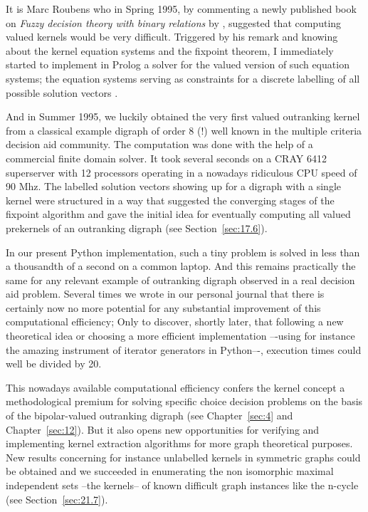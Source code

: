 It is Marc Roubens who in Spring 1995, by commenting a newly published book on \emph{Fuzzy decision theory with binary relations} by \cite{KIT-1993}, suggested that computing valued kernels would be very difficult. Triggered by his remark and knowing about the \Berge kernel equation systems and the \Neumann fixpoint theorem, I immediately started to implement in Prolog a solver for the valued version of such equation systems; the \Berge equation systems serving as constraints for a discrete labelling of all possible solution vectors \citep{BIS-1996}.

And in Summer 1995, we luckily obtained the very first valued outranking kernel from a classical example digraph of order 8 (!) well known in the multiple criteria decision aid community. The computation was done with the help of a commercial finite domain solver. It took several seconds on a CRAY 6412 superserver with 12 processors operating in a nowadays ridiculous CPU speed of 90 Mhz. The labelled solution vectors showing up for a digraph with a single kernel were structured in a way that suggested the converging stages of the \Neumann fixpoint algorithm and gave the initial idea for eventually computing all valued prekernels of an outranking digraph (see Section~\ref{sec:17.6}). 

In our present Python implementation, such a tiny problem is solved in less than a thousandth of a second on a common laptop. And this remains practically the same for any relevant example of outranking digraph observed in a real decision aid problem. Several times we wrote in our personal journal that there is certainly now no more potential for any substantial improvement of this computational efficiency; Only to discover, shortly later, that following a new theoretical idea or choosing a more efficient implementation –-using for instance the amazing instrument of iterator generators in Python–-, execution times could well be divided by 20.

This nowadays available computational efficiency confers the kernel concept a methodological premium for solving specific choice decision problems on the basis of the bipolar-valued outranking digraph (see Chapter~\vref{sec:4} and Chapter~\vref{sec:12}). But it also opens new opportunities for verifying and implementing kernel extraction algorithms for more graph theoretical purposes. New results concerning for instance unlabelled kernels in symmetric graphs could be obtained and we succeeded in enumerating the non isomorphic maximal independent sets --the kernels-- of known difficult graph instances like the n-cycle \citep*{ISO-2008} (see Section~\vref{sec:21.7}).

\clearpage


%